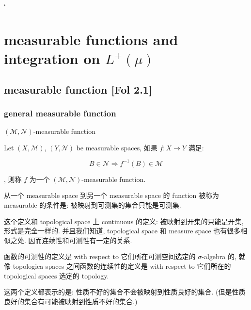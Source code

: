 \documentclass{qlnotes-export}
\begin{document}
`

\chapter{\texorpdfstring{measurable functions and integration on \(L^{+}(\mu)\)}{measurable functions and integration on L\^{}\{+\}(\textbackslash mu)}}\label{measurable-functions-and-integration-on-lmu}

\section{measurable function {[}Fol 2.1{]}}

\subsection{general measurable function}\label{general-measurable-function}

\begin{definition}{\((\mathcal{M},\mathcal{N})\)-measurable function}\label{def-04-measurable-functions-and-integration-on-l-mu-mathcal-m-mathcal-n-measurable-function}

Let \((X,\mathcal{M})\), \((Y,\mathcal{N})\) be measurable spaces, 如果 \(f:X\rightarrow Y\) 满足:

\[B \in \mathcal{N}\Longrightarrow f^{- 1}(B) \in \mathcal{M}\]

, 则称 \(f\) 为一个 \((\mathcal{M},\mathcal{N})\)-measurable function.

\end{definition}

从一个 measurable space 到另一个 measurable space 的 function 被称为 measurable 的条件是: 被映射到可测集的集合只能是可测集.

这个定义和 topological space 上 continuous 的定义: 被映射到开集的只能是开集, 形式是完全一样的. 并且我们知道, topological space 和 measure space 也有很多相似之处. 因而连续性和可测性有一定的关系.

函数的可测性的定义是 with respect to 它们所在可测空间选定的 \(\sigma\)-algebra 的, 就像 topologica spaces 之间函数的连续性的定义是 with respect to 它们所在的 topological spaces 选定的 topology.

这两个定义都表示的是: 性质不好的集合不会被映射到性质良好的集合. (但是性质良好的集合有可能被映射到性质不好的集合.)
\end{document}
